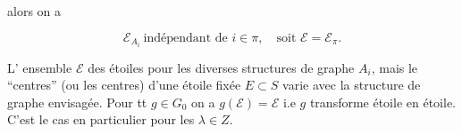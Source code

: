 alors on a

\[ \mathcal E_{A_i}\ \text{indépendant de }i\in\pi,\quad\text{soit }\mathcal E=\mathcal E_\pi. \tag*{(13)} \]

L'  ensemble $\mathcal E$  des étoiles pour les diverses structures de graphe $A_i$, mais le  ``centres''  (ou les centres) d'une étoile fixée $E\subset S$ varie\unsure{(nt]|(nt)} avec la structure de graphe envisagée. Pour tt $g\in G_0$ on a $g(\mathcal E)=\mathcal E$ i.e $g$ transforme étoile en étoile. C'est le cas en particulier pour les  $\lambda\in Z$.

